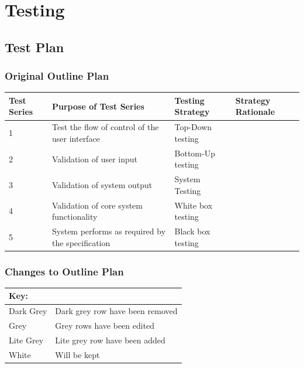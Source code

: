 \chapter{Testing}

\section{Test Plan}

\begin{landscape}
\subsection{Original Outline Plan}

\begin{center}
    \begin{tabular}{|p{2cm}|p{5cm}|p{5cm}|p{4cm}|}
        \hline
        \textbf{Test Series} & \textbf{Purpose of Test Series} & \textbf{Testing Strategy} & \textbf{Strategy Rationale}\\ \hline
        1 & Test the flow of control of the user interface  & Top-Down testing &  \\ \hline
        2 & Validation of user input & Bottom-Up testing &  \\ \hline
        3 & Validation of system output & System Testing & \\ \hline
        4 & Validation of core system functionality & White box testing & \\ \hline
        5 & System performs as required by the specification & Black box testing & \\ \hline
    \end{tabular}
\end{center}

\subsection{Changes to Outline Plan}


\begin{tabular}{|l|l|}
\hline
Key: & \\ \hline
\rowcolor{DarkGrey} Dark Grey & Dark grey row have been removed \\ \hline
\rowcolor{Grey} Grey & Grey rows have been edited \\\hline
\rowcolor{LiteGrey} Lite Grey & Lite grey row have been added\\ \hline
White & Will be kept \\ \hline
\end{tabular}



\end{landscape}
